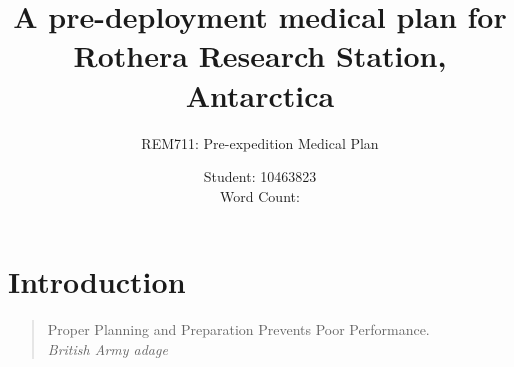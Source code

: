 \documentclass[12pt,a4paper]{article}
\title{A pre-deployment medical plan for Rothera Research Station, Antarctica}
\author{REM711: Pre-expedition Medical Plan}
\date{Student: 10463823 \\ Word Count: }
\begin{document}
\maketitle








\pagebreak

\tableofcontents

\pagebreak

\section{Introduction}

\begin{quote}
Proper Planning and Preparation Prevents Poor Performance. \\
\em British Army adage
\end{quote}
\end{document}
